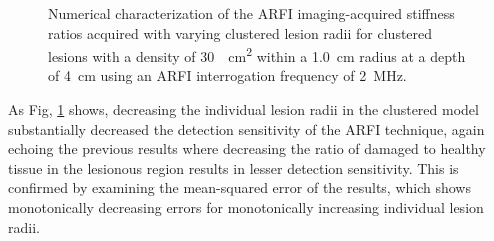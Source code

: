 			\begin{figure}[!htb]
				\centering
				\caption[Numerical characterization of ARFI imaging-acquired stiffness ratio with clustered lesions]{Numerical characterization of the ARFI imaging-acquired stiffness ratios acquired with varying clustered lesion radii for clustered lesions with a density of \SI{30}{\per\cm\squared} within a \SI{1.0}{cm} radius at a depth of \SI{4}{\cm} using an ARFI interrogation frequency of \SI{2}{\MHz}.}
				\label{fig:arfi_cluster_radius}
			\end{figure}

			As Fig, \ref{fig:arfi_cluster_radius} shows, decreasing the individual lesion radii in the clustered model substantially decreased the detection sensitivity of the ARFI technique, again echoing the previous results where decreasing the ratio of damaged to healthy tissue in the lesionous region results in lesser detection sensitivity. This is confirmed by examining the mean-squared error of the results, which shows monotonically decreasing errors for monotonically increasing individual lesion radii.

